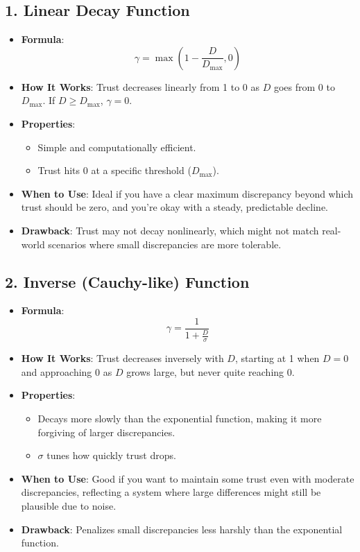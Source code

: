 \documentclass{article}
\begin{document}
\subsection*{1. Linear Decay Function}
\begin{itemize}
    \item \textbf{Formula}:
    \[
    \gamma = \max\left(1 - \frac{D}{D_{\text{max}}}, 0\right)
    \]
    \item \textbf{How It Works}: Trust decreases linearly from 1 to 0 as \(D\) goes from 0 to \(D_{\text{max}}\). If \(D \geq D_{\text{max}}\), \(\gamma = 0\).
    \item \textbf{Properties}:
    \begin{itemize}
        \item Simple and computationally efficient.
        \item Trust hits 0 at a specific threshold (\(D_{\text{max}}\)).
    \end{itemize}
    \item \textbf{When to Use}: Ideal if you have a clear maximum discrepancy beyond which trust should be zero, and you're okay with a steady, predictable decline.
    \item \textbf{Drawback}: Trust may not decay nonlinearly, which might not match real-world scenarios where small discrepancies are more tolerable.
\end{itemize}

\subsection*{2. Inverse (Cauchy-like) Function}
\begin{itemize}
    \item \textbf{Formula}:
    \[
    \gamma = \frac{1}{1 + \frac{D}{\sigma}}
    \]
    \item \textbf{How It Works}: Trust decreases inversely with \(D\), starting at 1 when \(D = 0\) and approaching 0 as \(D\) grows large, but never quite reaching 0.
    \item \textbf{Properties}:
    \begin{itemize}
        \item Decays more slowly than the exponential function, making it more forgiving of larger discrepancies.
        \item \(\sigma\) tunes how quickly trust drops.
    \end{itemize}
    \item \textbf{When to Use}: Good if you want to maintain some trust even with moderate discrepancies, reflecting a system where large differences might still be plausible due to noise.
    \item \textbf{Drawback}: Penalizes small discrepancies less harshly than the exponential function.
\end{itemize}
\end{document}
